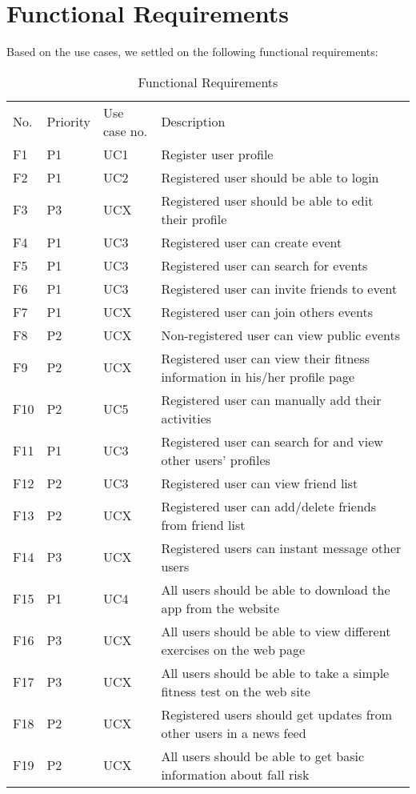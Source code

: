 \section{Functional Requirements}
Based on the use cases, we settled on the following functional requirements: 
\begin{center}
\begin{table}[H]
    \centering
\begin{tabular}{ |C{0.05\linewidth}|C{0.1\linewidth}|C{0.15\linewidth}|L{0.7\linewidth}| } 
 \hline {}
  \\
 \hline
 No. & Priority & Use case no. & Description \\
 \hline
 F1 & P1 & UC1 & Register user profile \\ 
 \hline
 F2 & P1 & UC2 & Registered user should be able to login \\ 
  \hline
 F3 & P3 & UCX & Registered user should be able to edit their profile \\
  \hline
 F4 & P1 & UC3 & Registered user can create event \\
  \hline
 F5 & P1 & UC3 & Registered user can search for events \\
  \hline
 F6 & P1 & UC3 & Registered user can invite friends to event \\
  \hline
 F7 & P1 & UCX & Registered user can join others events \\
  \hline
 F8 & P2 & UCX & Non-registered user can view public events \\
  \hline
 F9 & P2 & UCX & Registered user can view their fitness information in his/her profile page \\
  \hline
 F10 & P2 & UC5  & Registered user can manually add their activities \\
  \hline
 F11 & P1 & UC3  & Registered user can search for and view other users’ profiles \\
  \hline
 F12 & P2 & UC3  & Registered user can view friend list \\
  \hline
 F13 & P2 & UCX  & Registered user can add/delete friends from friend list \\
  \hline
 F14 & P3 & UCX  & Registered users can instant message other users \\
  \hline
 F15 & P1 & UC4  & All users should be able to download the app from the website \\
  \hline
 F16 & P3 & UCX  & All users should be able to view different exercises on the web page \\
  \hline
 F17 & P3 & UCX  & All users should be able to take a simple fitness test on the web site\\
  \hline
 F18 & P2 & UCX  & Registered users should get updates from other users in a news feed \\
  \hline
 F19 & P2 & UCX  & All users should be able to get basic information about fall risk \\
 \hline
\end{tabular}
\caption{Functional Requirements}
 \label{table:funcReq}
\end{table}
\end{center}


